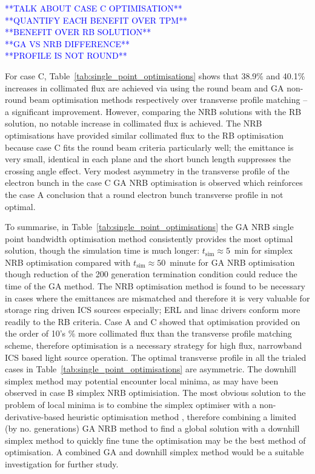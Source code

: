 \documentclass[../main.tex]{subfiles}
\begin{document}
\textcolor{blue}{**TALK ABOUT CASE C OPTIMISATION**\\ **QUANTIFY EACH BENEFIT OVER TPM** \\ **BENEFIT OVER RB SOLUTION** \\ **GA VS NRB DIFFERENCE** \\ **PROFILE IS NOT ROUND**}

For case C, Table~\ref{tab:single_point_optimisations} shows that 38.9\% and 40.1\% increases in collimated flux are achieved via using the round beam and GA non-round beam optimisation methods respectively over transverse profile matching -- a significant improvement. However, comparing the NRB solutions with the RB solution, no notable increase in collimated flux is achieved. The NRB optimisations have provided similar collimated flux to the RB optimisation because case C fits the round beam criteria particularly well; the emittance is very small, identical in each plane and the short bunch length suppresses the crossing angle effect. Very modest asymmetry in the transverse profile of the electron bunch in the case C GA NRB optimisation is observed which reinforces the case A conclusion that a round electron bunch transverse profile in not optimal.      

To summarise, in Table~\ref{tab:single_point_optimisations} the GA NRB single point bandwidth optimisation method consistently provides the most optimal solution, though the simulation time is much longer: $t_{\mathrm{sim}}\approx 5$~\si{\minute} for simplex NRB optimisation compared with $t_{\mathrm{sim}}\approx 50$~\si{minute} for GA NRB optimisation though reduction of the 200 generation termination condition could reduce the time of the GA method. The NRB optimisation method is found to be necessary in cases where the emittances are mismatched and therefore it is very valuable for storage ring driven ICS sources especially; ERL and linac drivers conform more readily to the RB criteria. Case A and C showed that optimisation provided on the order of 10's \% more collimated flux than the transverse profile matching scheme, therefore optimisation is a necessary strategy for high flux, narrowband ICS based light source operation. The optimal transverse profile in all the trialed cases in Table~\ref{tab:single_point_optimisations} are asymmetric. The downhill simplex method may potential encounter local minima, as may have been observed in case B simplex NRB optimisiation. The most obvious solution to the problem of local minima is to combine the simplex
optimiser with a non-derivative-based heuristic optimisation method \cite{jones2016design}, therefore combining a limited (by no. generations) GA NRB method to find a global solution with a downhill simplex method to quickly fine tune the optimisation may be the best method of optimisation. A combined GA and downhill simplex method would be a suitable investigation for further study.
\end{document}
